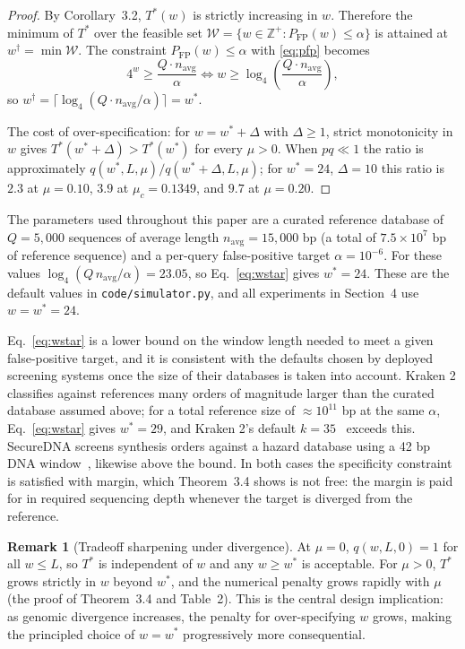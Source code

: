\documentclass[12pt]{article}
\theoremstyle{definition}
\newtheorem{remark}[definition]{Remark}
\theoremstyle{plain}
\begin{document}
\begin{proof}
By Corollary~3.2, $T^{*}(w)$ is strictly increasing in $w$. Therefore the
minimum of $T^{*}$ over the feasible set
$\mathcal{W}=\{w\in\mathbb{Z}^{+}:P_{\mathrm{FP}}(w)\le\alpha\}$ is attained
at $w^{\dagger}=\min\mathcal{W}$. The constraint $P_{\mathrm{FP}}(w)\le\alpha$
with \eqref{eq:pfp} becomes
\[
  4^{w}\ge\frac{Q\cdot n_{\mathrm{avg}}}{\alpha}\iff w\ge\log_4\!\left(\frac{Q\cdot n_{\mathrm{avg}}}{\alpha}\right),
\]
so $w^{\dagger}=\lceil\log_4(Q\cdot n_{\mathrm{avg}}/\alpha)\rceil=w^{*}$.

The cost of over-specification: for $w=w^{*}+\Delta$ with $\Delta\ge1$,
strict monotonicity in $w$ gives $T^{*}(w^{*}+\Delta)>T^{*}(w^{*})$ for every
$\mu>0$. When $pq\ll1$ the ratio is approximately
$q(w^{*},L,\mu)/q(w^{*}+\Delta,L,\mu)$; for $w^{*}=24$, $\Delta=10$ this
ratio is $2.3$ at $\mu=0.10$, $3.9$ at $\mu_c=0.1349$, and $9.7$ at
$\mu=0.20$.
\end{proof}

The parameters used throughout this paper are a curated reference database of
$Q=5{,}000$ sequences of average length $n_{\mathrm{avg}}=15{,}000$ bp (a
total of $7.5\times10^{7}$ bp of reference sequence) and a per-query
false-positive target $\alpha=10^{-6}$. For these values
$\log_4(Q\,n_{\mathrm{avg}}/\alpha)=23.05$, so Eq.~\eqref{eq:wstar} gives
$w^{*}=24$. These are the default values in \texttt{code/simulator.py}, and
all experiments in Section~4 use $w=w^{*}=24$.

Eq.~\eqref{eq:wstar} is a lower bound on the window length needed to meet a
given false-positive target, and it is consistent with the defaults chosen by
deployed screening systems once the size of their databases is taken into
account. Kraken 2 classifies against references many orders of magnitude
larger than the curated database assumed above; for a total reference size of
$\approx10^{11}$ bp at the same $\alpha$, Eq.~\eqref{eq:wstar} gives
$w^{*}=29$, and Kraken 2's default $k=35$~\cite{wood2019} exceeds this.
SecureDNA screens synthesis orders against a hazard database using a 42 bp
DNA window~\cite{securedna}, likewise above the bound. In both cases the
specificity constraint is satisfied with margin, which Theorem~3.4 shows is
not free: the margin is paid for in required sequencing depth whenever the
target is diverged from the reference.

\begin{remark}[Tradeoff sharpening under divergence]\label{rem:tradeoff}
At $\mu=0$, $q(w,L,0)=1$ for all $w\le L$, so $T^{*}$ is independent of $w$
and any $w\ge w^{*}$ is acceptable. For $\mu>0$, $T^{*}$ grows strictly in
$w$ beyond $w^{*}$, and the numerical penalty grows rapidly with $\mu$ (the
proof of Theorem~3.4 and Table~2). This is the central design implication: as
genomic divergence increases, the penalty for over-specifying $w$ grows,
making the principled choice of $w=w^{*}$ progressively more consequential.
\end{remark}
\end{document}
